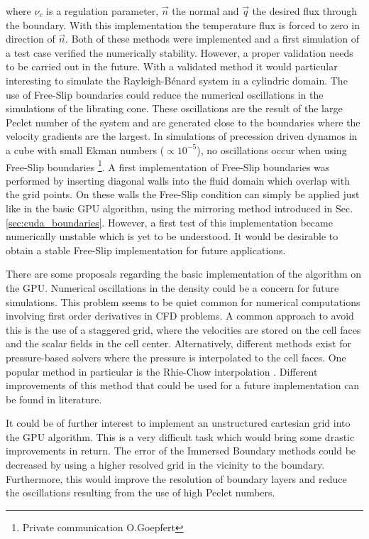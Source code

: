 where $\nu_c$ is a regulation parameter, $\vec{n}$ the normal and $\vec{q}$  the desired flux through the boundary.
With this implementation the temperature flux is forced to zero in direction of $\vec{n}$.
Both of these methods were implemented and a first simulation of a test case verified the numerically stability.
However, a proper validation needs to be carried out in the future.
With a validated method it would  particular interesting to simulate
the Rayleigh-B\'{e}nard system in a cylindric domain.
\clearpage
The use of Free-Slip boundaries could reduce the numerical oscillations in the simulations of the librating cone.
These oscillations are the result of the large Peclet number of the system and are generated
close to the boundaries where the velocity gradients are the largest.
In simulations of precession driven dynamos in a cube with small Ekman numbers ($\propto 10^{-5}$),
no oscillations occur when using Free-Slip boundaries \footnote{Private communication O.Goepfert}.
A first implementation of Free-Slip boundaries was performed
by inserting diagonal walls into the fluid domain which overlap with the grid points.
On these walls the Free-Slip condition can simply be applied just like in the basic GPU algorithm,
using the mirroring method introduced in Sec. \ref{sec:cuda_boundaries}.
However, a first test of this implementation became numerically unstable which is yet to be understood.
It would be desirable to obtain a stable Free-Slip implementation for future applications.

There are some proposals regarding the basic implementation of the algorithm on the GPU.
Numerical oscillations in the density could be a concern for future simulations.
This problem seems to be quiet common for numerical computations involving first order derivatives in CFD problems.
A common approach to avoid this is the use of a staggered grid, where the velocities
are stored on the cell faces and the scalar fields in the cell center.
Alternatively, different methods exist for pressure-based solvers where the pressure is interpolated to the cell faces.
One popular method in particular is the Rhie-Chow interpolation \citep{Rhie1983}.
Different improvements of this method that could be used for a future implementation can be found in literature.

It could be of further interest to implement an unstructured cartesian grid into the GPU algorithm.
This is a very difficult task which would bring some drastic improvements in return.
The error of the Immersed Boundary methods could be decreased by using a higher resolved grid in the vicinity to the boundary.
Furthermore, this would improve the resolution of boundary layers  and reduce the oscillations resulting from the use of high Peclet numbers.

